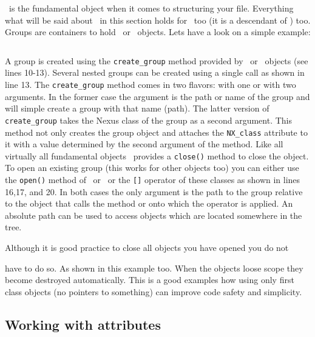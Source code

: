 
\nxgroup\ is the fundamental object when it comes to structuring your file.
Everything what will be said about \nxgroup\ in this section holds for \nxfile\
too (it is a descendant of \nxgroup) too.
Groups are containers to hold \nxgroup\ or \nxfield\ objects.
Lets have a look on a simple example:

\inputminted[linenos=true]{c++}{../examples/c++/nxgroup_ex1.cpp}

A group is created using the {\tt create\_group} method provided by \nxgroup\ or
\nxfile\ objects (see lines 10-13). Several nested groups can be created using 
a single call as shown in line 13. The {\tt create\_group} method comes in 
two flavors: with one or with two arguments. In the former case the argument is
the path or name of the group and will simple create a group with that name
(path). The latter version of {\tt create\_group} takes the Nexus class 
of the group as a second argument. This method not only creates the group object
and attaches the {\tt NX\_class} attribute to it with a value determined by the 
second argument of the method.
Like all virtually all fundamental objects \nxgroup\ provides a {\tt close()}
method to close the object.
To open an existing group (this works for other objects too) you can either use
the {\tt open()} method of \nxgroup\ or \nxfile\ or the {\tt []} operator 
of these classes as shown in lines 16,17, and 20. In both cases the only
argument is the path to the group relative to the object that calls the method
or onto which the operator is applied. An absolute path can be used to access
objects which are located somewhere in the tree.

Although it is good practice to close all objects you have opened you do not

have to do so. As shown in this example too. When the objects loose scope they
become destroyed automatically. This is a good examples how using only first
class objects (no pointers to something) can improve code safety and simplicity.


\subsection{Working with attributes}

